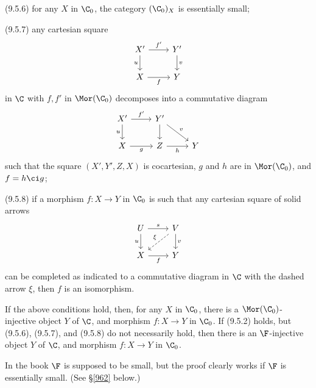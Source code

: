 \documentclass[12pt]{article}
\theoremstyle{remark}
\theoremstyle{definition}
\begin{document}
\nn(9.5.6) for any $X$ in $\C_0$, the category $(\C_0)_X$ is essentially small;

\nn(9.5.7) any cartesian square 
$$
\begin{tikzcd}
X'\ar{d}[swap]{u}\ar{r}{f'}&Y'\ar{d}{v}\\ 
X\ar{r}[swap]{f}&Y
\end{tikzcd}
$$ 
in $\C$ with $f,f'$ in $\Mor(\C_0)$ decomposes into a commutative diagram 
$$
\begin{tikzcd}
X'\ar{d}[swap]{u}\ar{r}{f'}&Y'\ar{d}\ar{rd}{v}\\ 
X\ar{r}[swap]{g}&Z\ar{r}[swap]{h}&Y
\end{tikzcd}
$$ 
such that the square $(X',Y',Z,X)$ is cocartesian, $g$ and $h$ are in $\Mor(\C_0)$, and $f=h\ci g$; 

\nn(9.5.8) if a morphism $f:X\to Y$ in $\C_0$ is such that any cartesian square of solid arrows
$$
\begin{tikzcd}
U\ar{d}[swap]{u}\ar{r}{s}&V\ar{d}{v}\ar[dashed]{ld}[swap]{\xi}\\ 
X\ar{r}[swap]{f}&Y
\end{tikzcd}
$$ 
can be completed as indicated to a commutative diagram in $\C$ with the dashed arrow $\xi$, then $f$ is an isomorphism. 
%
\begin{thm} 
If the above conditions hold, then, for any $X$ in $\C_0$, there is a $\Mor(\C_0)$-injective object $Y$ of $\C$, and morphism $f:X\to Y$ in $\C_0$. If (9.5.2) holds, but (9.5.6), (9.5.7), and (9.5.8) do not necessarily hold, then there is an $\F$-injective object $Y$ of $\C$, and morphism $f:X\to Y$ in $\C_0$.
\end{thm}
%
\begin{rk}
In the book $\F$ is supposed to be small, but the proof clearly works if $\F$ is essentially small. (See \S\ref{962} below.)
\end{rk}


\end{document}
